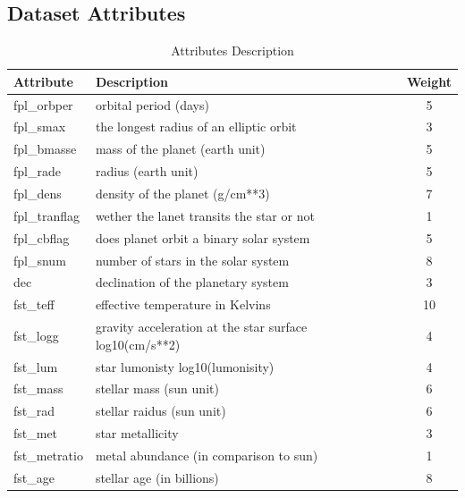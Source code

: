 \documentclass[12p]{article}
\begin{document}
\begin{landscape}
    \section{Dataset Attributes}
    \begin{table}[!h]\centering
        \caption{Attributes Description}
        \label{tab:att_desc}
        \begin{tabular}{|l l c|}\hline
            Attribute         & Description & Weight \\ \hline\hline
            fpl\_orbper      & orbital period (days) & 5 \\ \hline
            fpl\_smax        & the longest radius of an elliptic orbit & 3 \\ \hline
            fpl\_bmasse    & mass of the planet (earth unit) & 5 \\ \hline
            fpl\_rade         & radius (earth unit) & 5 \\ \hline
            fpl\_dens        & density of the planet (g/cm**3) & 7 \\ \hline
            fpl\_tranflag    & wether the lanet transits the star or not & 1 \\ \hline
            fpl\_cbflag      & does planet orbit a binary solar system & 5 \\ \hline
            fpl\_snum       & number of stars in the solar system & 8 \\ \hline
            dec                 & declination of the planetary system & 3 \\ \hline
            fst\_teff          & effective temperature in Kelvins & 10 \\ \hline
            fst\_logg        & gravity acceleration at the star surface log10(cm/s**2) & 4 \\ \hline
            fst\_lum         & star lumonisty log10(lumonisity) & 4 \\ \hline
            fst\_mass       & stellar mass (sun unit) & 6 \\ \hline
            fst\_rad         & stellar raidus (sun unit) & 6 \\ \hline
            fst\_met        & star metallicity & 3 \\ \hline
            fst\_metratio & metal abundance (in comparison to sun) & 1 \\ \hline
            fst\_age         & stellar age (in billions) & 8 \\ \hline
        \end{tabular}
    \end{table}
    

\end{landscape}
\end{document}
